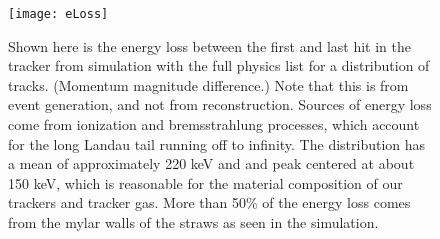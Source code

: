 \begin{figure}[]
\caption{Shown here is the energy loss between the first and last hit in the tracker from simulation with the full physics list for a distribution of tracks. (Momentum magnitude difference.) Note that this is from event generation, and not from reconstruction. Sources of energy loss come from ionization and bremsstrahlung processes, which account for the long Landau tail running off to infinity. The distribution has a mean of approximately 220 keV and and peak centered at about 150 keV, which is reasonable for the material composition of our trackers and tracker gas. More than 50\% of the energy loss comes from the mylar walls of the straws as seen in the simulation.}
\centering
\texttt{[image: eLoss]}
\label{fig:eLoss}
\end{figure}
